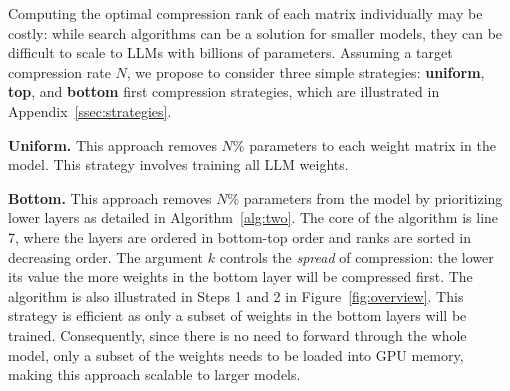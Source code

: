 \documentclass[11pt]{article}
\newcommand{\myparagraph}[1]{\noindent\textbf{#1}}
\begin{document}
\begin{table}[t]
    \caption{\textbf{40\% compressed Phi-2 3B competes with models of similar size while being compressed using only 13M tokens.} Compressing Phi-2 3B to 1.7B (by removing 40\% of the parameters) and comparing its zero-shot performance to other recent language models of similar sizes.}
    \label{tab:smollm}
\end{table}

Computing the optimal compression rank of each matrix individually may be
costly: while search algorithms can be a solution for smaller models, they can be difficult to scale
to LLMs with billions of parameters. 
Assuming a target compression rate $N$, we propose to consider
three simple strategies: \textbf{uniform}, \textbf{top}, and \textbf{bottom} first compression strategies, which are illustrated in Appendix~\ref{ssec:strategies}.

\myparagraph{Uniform.} This approach removes
$N$\% parameters to each weight matrix in the model. This strategy
involves training all LLM weights.

\myparagraph{Bottom.} This approach removes
$N$\% parameters from the model by prioritizing lower layers as
detailed in Algorithm~\ref{alg:two}. The core of the algorithm is line 7,
where the layers are ordered in bottom-top order and ranks are sorted in
decreasing order. The argument $k$ controls the \textit{spread} of compression: the
lower its value the more weights in the bottom layer will be compressed first.
The algorithm is also illustrated in Steps 1 and 2 in
Figure~\ref{fig:overview}. This strategy is efficient as only a subset of
weights in the bottom layers will be trained. Consequently, since there is no
need to forward through the whole model, only a subset of the weights needs to be loaded into GPU memory, making this approach scalable to larger models.
\end{document}
